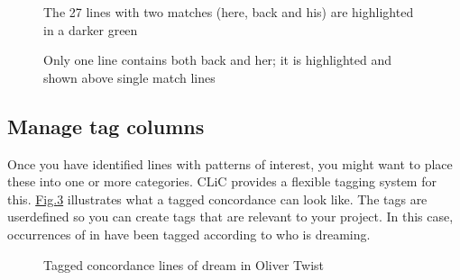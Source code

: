 \documentclass[letterpaper,10pt,english]{sphinxmanual}
\begin{document}
\begin{figure}[htbp]
\centering
\capstart

\noindent{}
\caption{The 27 lines with two matches (here, back and his) are
highlighted in a darker green}\label{\detokenize{clicanalysis/concordance:id19}}\label{\detokenize{clicanalysis/concordance:figure-analysis-concordance-kwicgrouper-firebackhis}}\end{figure}

\begin{figure}[htbp]
\centering
\capstart

\noindent{}
\caption{Only one line contains both back and her; it is
highlighted and shown above single match lines}\label{\detokenize{clicanalysis/concordance:id20}}\label{\detokenize{clicanalysis/concordance:figure-analysis-concordance-kwicgrouper-firebackher}}\end{figure}


\subsection{Manage tag columns}
\label{\detokenize{clicanalysis/concordance:manage-tag-columns}}\label{\detokenize{clicanalysis/concordance:id7}}
\sphinxAtStartPar
Once you have identified lines with patterns of interest, you might want
to place these into one or more categories. CLiC provides a flexible
tagging system for this.
\hyperref[\detokenize{clicanalysis/concordance:figure-analysis-concordance-tagcolumns-dream}]{Fig.\@ \ref{\detokenize{clicanalysis/concordance:figure-analysis-concordance-tagcolumns-dream}}} illustrates
what a tagged concordance can look like. The tags are
user\sphinxhyphen{}defined so you can create tags that are relevant to your project.
In this case, occurrences of  in  have been tagged
according to who is dreaming.

\begin{figure}[htbp]
\centering
\capstart

\noindent{}
\caption{Tagged concordance lines of dream in Oliver Twist}\label{\detokenize{clicanalysis/concordance:id21}}\label{\detokenize{clicanalysis/concordance:figure-analysis-concordance-tagcolumns-dream}}\end{figure}
\end{document}
